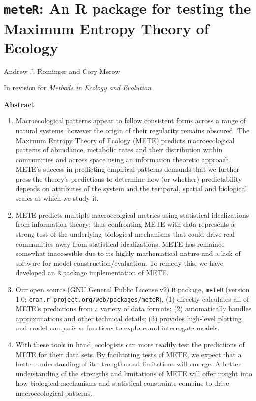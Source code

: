 \chapter{\texttt{meteR}: An R package for testing the Maximum Entropy Theory of Ecology}

{\large Andrew J. Rominger and Cory Merow}
\vspace{3.5em}

\noindent
In revision for \textit{Methods in Ecology and Evolution}

\clearpage

\noindent
\textbf{Abstract}
\vspace{\baselineskip}

\begin{enumerate}
\item Macroecological patterns appear to follow consistent forms
  across a range of natural systems, however the origin of their
  regularity remains obscured. The Maximum Entropy Theory of Ecology
  (METE) predicts macroecological patterns of abundance, metabolic
  rates and their distribution within communities and across space
  using an information theoretic approach. METE's success in
  predicting empirical patterns demands that we further press the
  theory's predictions to determine how (or whether) predictability
  depends on attributes of the system and the temporal, spatial and
  biological scales at which we study it.
%
\item METE predicts multiple macroecolgical metrics using statistical
  idealizations from information theory; thus confronting METE with
  data represents a strong test of the underlying biological
  mechanisms that could drive real communities away from statistical
  idealizations. METE has remained somewhat inaccessible due to its
  highly mathematical nature and a lack of software for model
  construction/evaluation. To remedy this, we have developed an
  \texttt{R} package implementation of METE.
%
\item Our open source (GNU General Public License v2) \texttt{R} package,
  \texttt{meteR} (version 1.0;
  \texttt{cran.r-project.org/web/packages/meteR}), (1) directly
  calculates
  all of METE's predictions from a variety of data formats; (2)
  automatically handles approximations and other technical details;
  (3) provides high-level plotting and model comparison functions to
  explore and interrogate models. 
%
\item With these tools in hand, ecologists can more readily test the
  predictions of METE for their data sets. By facilitating tests of
  METE, we expect that a better understanding of its strengths and
  limitations will emerge. A better understanding of the strengths and
  limitations of METE will offer insight into how biological
  mechanisms and statistical constraints combine to drive
  macroecological patterns.
\end{enumerate}

